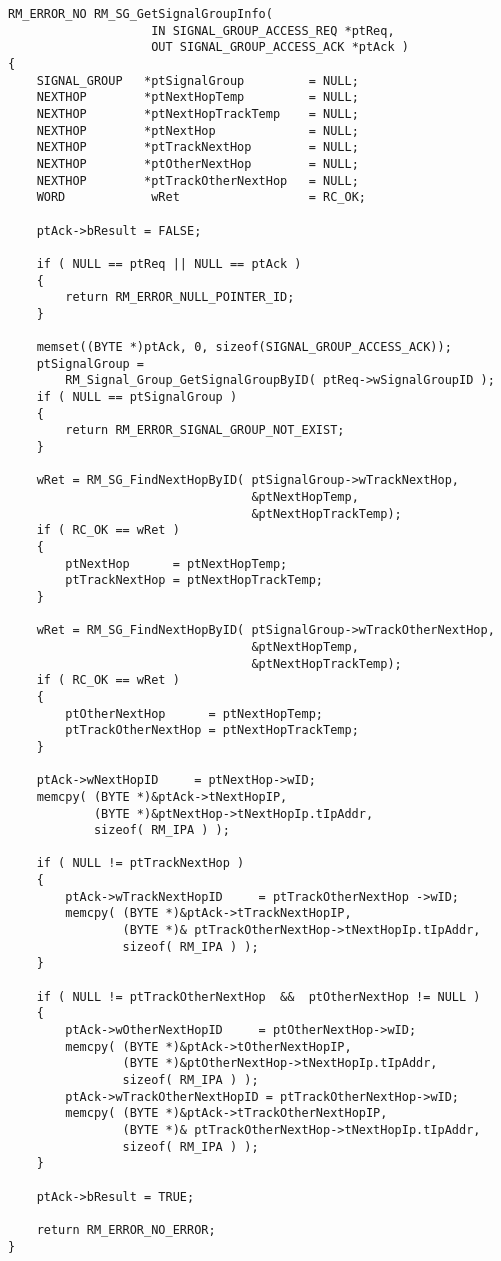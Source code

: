 ﻿\documentclass  [11pt,twocolumn]{article}
\begin{document}
\begin{lstlisting}
RM_ERROR_NO RM_SG_GetSignalGroupInfo( 
                    IN SIGNAL_GROUP_ACCESS_REQ *ptReq,
                    OUT SIGNAL_GROUP_ACCESS_ACK *ptAck )
{
    SIGNAL_GROUP   *ptSignalGroup         = NULL;
    NEXTHOP        *ptNextHopTemp         = NULL;
    NEXTHOP        *ptNextHopTrackTemp    = NULL;
    NEXTHOP        *ptNextHop             = NULL;
    NEXTHOP        *ptTrackNextHop        = NULL;
    NEXTHOP        *ptOtherNextHop        = NULL;
    NEXTHOP        *ptTrackOtherNextHop   = NULL;
    WORD            wRet                  = RC_OK;

    ptAck->bResult = FALSE; 
    
    if ( NULL == ptReq || NULL == ptAck )
    {
        return RM_ERROR_NULL_POINTER_ID;
    }

    memset((BYTE *)ptAck, 0, sizeof(SIGNAL_GROUP_ACCESS_ACK));
    ptSignalGroup = 
        RM_Signal_Group_GetSignalGroupByID( ptReq->wSignalGroupID );
    if ( NULL == ptSignalGroup )
    {
        return RM_ERROR_SIGNAL_GROUP_NOT_EXIST;
    }

    wRet = RM_SG_FindNextHopByID( ptSignalGroup->wTrackNextHop, 
                                  &ptNextHopTemp,
                                  &ptNextHopTrackTemp);
    if ( RC_OK == wRet )
    {
        ptNextHop      = ptNextHopTemp;
        ptTrackNextHop = ptNextHopTrackTemp;
    }

    wRet = RM_SG_FindNextHopByID( ptSignalGroup->wTrackOtherNextHop, 
                                  &ptNextHopTemp,
                                  &ptNextHopTrackTemp);
    if ( RC_OK == wRet )
    {
        ptOtherNextHop      = ptNextHopTemp;
        ptTrackOtherNextHop = ptNextHopTrackTemp;
    }
    
    ptAck->wNextHopID     = ptNextHop->wID;    
    memcpy( (BYTE *)&ptAck->tNextHopIP, 
            (BYTE *)&ptNextHop->tNextHopIp.tIpAddr,
            sizeof( RM_IPA ) );
    
    if ( NULL != ptTrackNextHop )
    {
        ptAck->wTrackNextHopID     = ptTrackOtherNextHop ->wID;
        memcpy( (BYTE *)&ptAck->tTrackNextHopIP, 
                (BYTE *)& ptTrackOtherNextHop->tNextHopIp.tIpAddr,
                sizeof( RM_IPA ) );
    }

    if ( NULL != ptTrackOtherNextHop  &&  ptOtherNextHop != NULL )
    {
        ptAck->wOtherNextHopID     = ptOtherNextHop->wID;   
        memcpy( (BYTE *)&ptAck->tOtherNextHopIP, 
                (BYTE *)&ptOtherNextHop->tNextHopIp.tIpAddr,
                sizeof( RM_IPA ) );
        ptAck->wTrackOtherNextHopID = ptTrackOtherNextHop->wID;
        memcpy( (BYTE *)&ptAck->tTrackOtherNextHopIP, 
                (BYTE *)& ptTrackOtherNextHop->tNextHopIp.tIpAddr,
                sizeof( RM_IPA ) );
    }

    ptAck->bResult = TRUE;
    
    return RM_ERROR_NO_ERROR;
}
\end{lstlisting}
\end{document}
